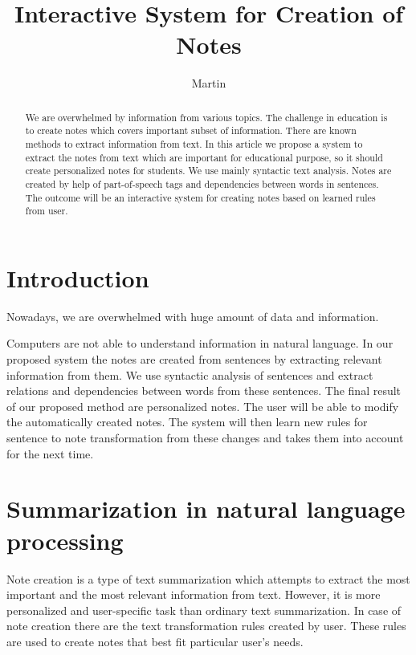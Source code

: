 \documentclass{iitsrc}
\title{Interactive System for Creation of Notes}
\author{Martin}{Nemček}
\begin{document}
\begin{abstract}
	We are overwhelmed by information from various topics. The challenge in education is to create notes which covers important subset of information. There are known methods to extract information from text. In this article we propose a system to extract the notes from text which are important for educational purpose, so it should create personalized notes for students. We use mainly syntactic text analysis. Notes are created by help of part-of-speech tags and dependencies between words in sentences. The outcome will be an interactive system for creating notes based on learned rules from user.
\end{abstract}

\section{Introduction} \label{introduction}
	Nowadays, we are overwhelmed with huge amount of data and information. %
	
	
	Computers are not able to understand information in natural language. In our proposed system the notes are created from sentences by extracting relevant information from them. We use syntactic analysis of sentences and extract relations and dependencies between words from these sentences. The final result of our proposed method are personalized notes. The user will be able to modify the automatically created notes. The system will then learn new rules for sentence to note transformation from these changes and takes them into account for the next time.
	
\section{Summarization in natural language processing}	\label{sec:summarization_nlp}
	Note creation is a type of text summarization which attempts to extract the most important and the most relevant information from text. However, it is more personalized and user-specific task than ordinary text summarization. In case of note creation there are the text transformation rules created by user. These rules are used to create notes that best fit particular user's needs. 
\end{document}
